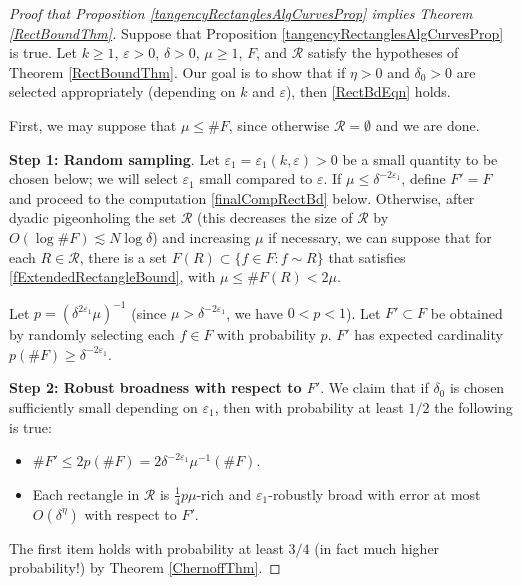 \documentclass[letterpaper, reqno,11pt]{article}
\numberwithin{equation}{section}
\newcommand{\eps}{\varepsilon}
\numberwithin{thm}{section}
\theoremstyle{remark}
\begin{document}
\begin{proof}[Proof that Proposition \ref{tangencyRectanglesAlgCurvesProp} implies Theorem \ref{RectBoundThm}]
Suppose that Proposition \ref{tangencyRectanglesAlgCurvesProp} is true. Let $k\geq 1$, $\eps>0$, $\delta>0$, $\mu\geq 1$, $F$, and $\mathcal{R}$ satisfy the hypotheses of Theorem \ref{RectBoundThm}. Our goal is to show that if $\eta>0$ and $\delta_0>0$ are selected appropriately (depending on $k$ and $\eps$), then \eqref{RectBdEqn} holds.

First, we may suppose that $\mu\leq\#F$, since otherwise $\mathcal{R}=\emptyset$ and we are done. %


\medskip

\noindent\textbf {Step 1: Random sampling}.
Let $\eps_1=\eps_1(k,\eps)>0$ be a small quantity to be chosen below; we will select $\eps_1$ small compared to $\eps$. If $\mu\leq\delta^{-2\eps_1}$, define $F'=F$ and proceed to the computation \eqref{finalCompRectBd} below. Otherwise, after dyadic pigeonholing the set $\mathcal{R}$ (this decreases the size of $\mathcal{R}$ by $O(\log\# F)\lesssim N\log\delta$) and increasing $\mu$ if necessary, we can suppose that for each $R\in\mathcal{R}$, there is a set $F(R)\subset\{f\in F\colon f\sim R\}$ that satisfies \eqref{fExtendedRectangleBound}, with $\mu\leq \#F(R) < 2\mu$. 

Let $p = (\delta^{2\eps_1}\mu)^{-1}$ (since $\mu>\delta^{-2\eps_1}$, we have $0<p<1$). Let $F'\subset F$ be obtained by randomly selecting each $f\in F$ with probability $p$. $F'$ has expected cardinality $p(\#F)\geq\delta^{-2\eps_1}$. 

\medskip

\noindent\textbf {Step 2: Robust broadness with respect to $F'$}.
We claim that if $\delta_0$ is chosen sufficiently small depending on $\eps_1$, then with probability at least $1/2$ the following is true:
\begin{itemize}
    \item $\#F' \leq 2p(\#F)=2\delta^{-2\eps_1}\mu^{-1}(\#F).$
    \item Each rectangle in $\mathcal{R}$ is $\frac{1}{4}p\mu$-rich and $\eps_1$-robustly broad with error at most $O(\delta^{\eta})$ with respect to $F'$. 
\end{itemize}
The first item holds with probability at least $3/4$ (in fact much higher probability!) by Theorem \ref{ChernoffThm}.  


\end{proof}
\end{document}
